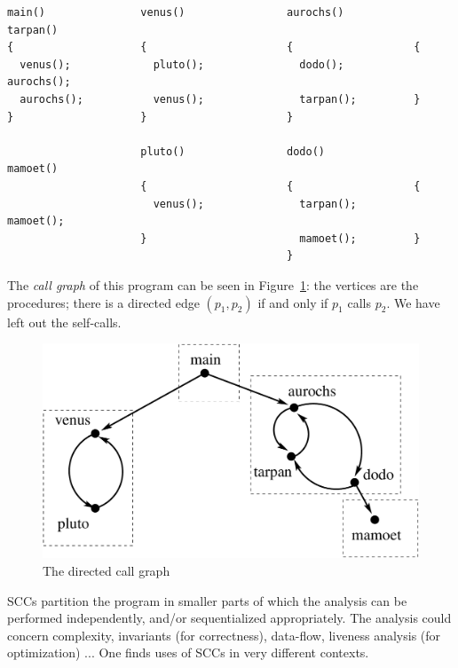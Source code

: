 \begin{Verbatim}[frame=single, samepage=true, fontsize=\scriptsize]
main()               venus()                aurochs()           tarpan()
{                    {                      {                   {
  venus();             pluto();               dodo();             aurochs();
  aurochs();           venus();               tarpan();         }
}                    }                      }

                     pluto()                dodo()              mamoet()
                     {                      {                   {
                       venus();               tarpan();           mamoet();
                     }                        mamoet();         }
                                            }
\end{Verbatim}
The {\em call graph} of this program can be seen in
Figure~\ref{vbtarjan}: the vertices are the procedures; there is a
directed edge $(p_1,p_2)$ if and only if $p_1$ calls $p_2$. We have
left out the self-calls.



\begin{figure}[h]
\begin{center}
\includegraphics[height=0.2\textheight,keepaspectratio]{vbtarjan}
\caption{The directed call graph}\label{vbtarjan}
\end{center}
\end{figure}

SCCs partition the program in smaller parts of which the analysis can
be performed independently, and/or sequentialized
appropriately. The analysis could concern complexity, invariants (for
correctness), data-flow, liveness analysis (for optimization) ... One
finds uses of SCCs in very different contexts.


